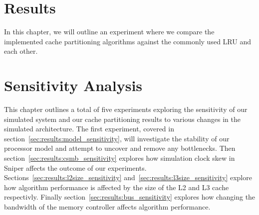 \chapter{Results}
\label{cpt:results}
In this chapter, we will outline an experiment where we compare the implemented cache partitioning algorithms against the commonly used LRU and each other.




\chapter{Sensitivity Analysis}
\label{cpt:sresults}
This chapter outlines a total of five experiments exploring the sensitivity of our simulated system and our cache partitioning results to various changes in the simulated architecture.
The first experiment, covered in section~\ref{sec:results:model_sensitivity}, will investigate the stability of our processor model and attempt to uncover and remove any bottlenecks.
Then section~\ref{sec:results:csmb_sensitivity} explores how simulation clock skew in Sniper affects the outcome of our experiments.
Sections~\ref{sec:results:l2size_sensitivity} and~\ref{sec:results:l3size_sensitivity} explore how algorithm performance is affected by the size of the L2 and L3 cache respectivly.
Finally section~\ref{sec:results:bus_sensitivity} explores how changing the bandwidth of the memory controller affects algorithm performance.










